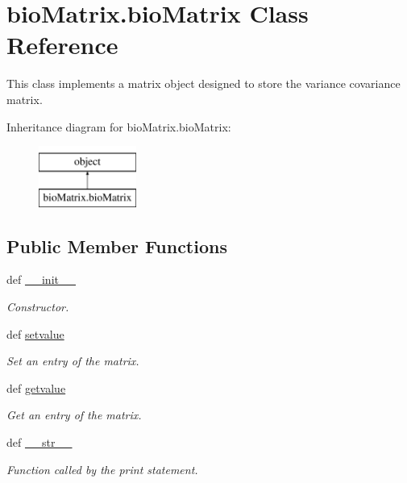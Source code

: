 \hypertarget{classbio_matrix_1_1bio_matrix}{\section{bio\+Matrix.\+bio\+Matrix Class Reference}
\label{classbio_matrix_1_1bio_matrix}
}


This class implements a matrix object designed to store the variance covariance matrix.  


Inheritance diagram for bio\+Matrix.\+bio\+Matrix\+:\begin{figure}[H]
\begin{center}
\leavevmode
\includegraphics[height=2.000000cm]{dd/de9/classbio_matrix_1_1bio_matrix}
\end{center}
\end{figure}
\subsection*{Public Member Functions}
\begin{DoxyCompactItemize}
\item 
def \hyperlink{classbio_matrix_1_1bio_matrix_a0924580e7767b45da03405cbb54b505c}{\+\_\+\+\_\+init\+\_\+\+\_\+}
\begin{DoxyCompactList}\small\item\em Constructor. \end{DoxyCompactList}\item 
def \hyperlink{classbio_matrix_1_1bio_matrix_a4192e4d0f7b1978559d06478c5bad330}{setvalue}
\begin{DoxyCompactList}\small\item\em Set an entry of the matrix. \end{DoxyCompactList}\item 
def \hyperlink{classbio_matrix_1_1bio_matrix_a3083675e2837632d201b4f94ab449703}{getvalue}
\begin{DoxyCompactList}\small\item\em Get an entry of the matrix. \end{DoxyCompactList}\item 
def \hyperlink{classbio_matrix_1_1bio_matrix_ac838522b7fff4159e4a97a2548bc2cbc}{\+\_\+\+\_\+str\+\_\+\+\_\+}
\begin{DoxyCompactList}\small\item\em Function called by the print statement. \end{DoxyCompactList}\end{DoxyCompactItemize}
